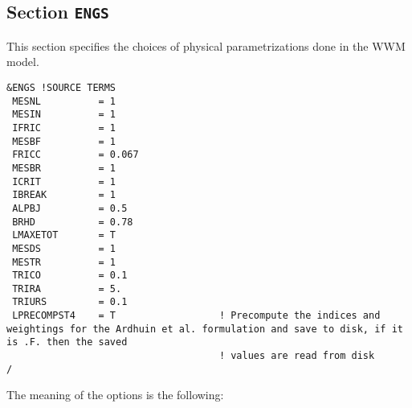 \documentclass[12pt]{amsart}
\begin{document}
\subsection{Section {\tt ENGS}}
This section specifies the choices of physical parametrizations done in the WWM model.
\begin{verbatim}
&ENGS !SOURCE TERMS
 MESNL          = 1      
 MESIN          = 1      
 IFRIC          = 1              
 MESBF          = 1              
 FRICC          = 0.067          
 MESBR          = 1              
 ICRIT          = 1              
 IBREAK         = 1
 ALPBJ          = 0.5            
 BRHD           = 0.78           
 LMAXETOT       = T              
 MESDS          = 1              
 MESTR          = 1          
 TRICO          = 0.1        
 TRIRA          = 5.       
 TRIURS         = 0.1      
 LPRECOMPST4    = T                  ! Precompute the indices and weightings for the Ardhuin et al. formulation and save to disk, if it is .F. then the saved
                                     ! values are read from disk
/
\end{verbatim}
The meaning of the options is the following:
\end{document}
